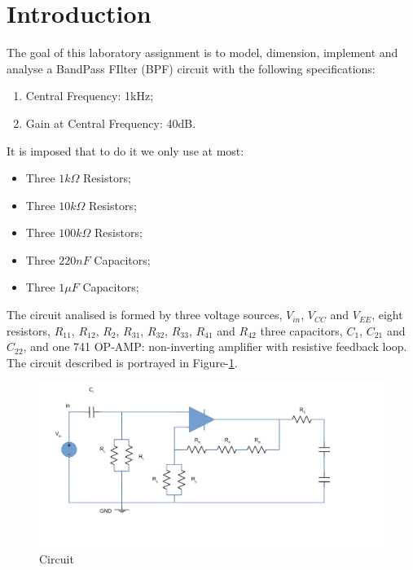 \section{Introduction}
\label{sec:introduction}

\par The goal of this laboratory assignment is to model, dimension, implement and analyse a BandPass FIlter (BPF) circuit with the following specifications:
\begin{enumerate}
	\item Central Frequency: 1kHz;
	\item Gain at Central Frequency: 40dB.
\end{enumerate}

\par It is imposed that to do it we only use at most:
\begin{itemize}
	\item Three $1k\Omega$ Resistors;
	\item Three $10k\Omega$ Resistors;
	\item Three $100k\Omega$ Resistors;
	\item Three $220nF$ Capacitors;
	\item Three $1\mu F$ Capacitors;
\end{itemize}

\par The circuit analised is formed by three voltage sources, $V_{in}$, $V_{CC}$ and $V_{EE}$,
eight resistors, $R_{11}$, $R_{12}$, $R_{2}$, $R_{31}$, $R_{32}$, $R_{33}$, $R_{41}$ and $R_{42}$
three capacitors, $C_1$, $C_{21}$ and $C_{22}$, and one 741 OP-AMP: non-inverting amplifier
with resistive feedback loop. The circuit described
is portrayed in Figure-\ref{fig:circuit}.

\begin{figure}[h] \centering
\includegraphics[width=1\linewidth]{circuit.pdf}
\caption{Circuit}
\label{fig:circuit}
\end{figure}


